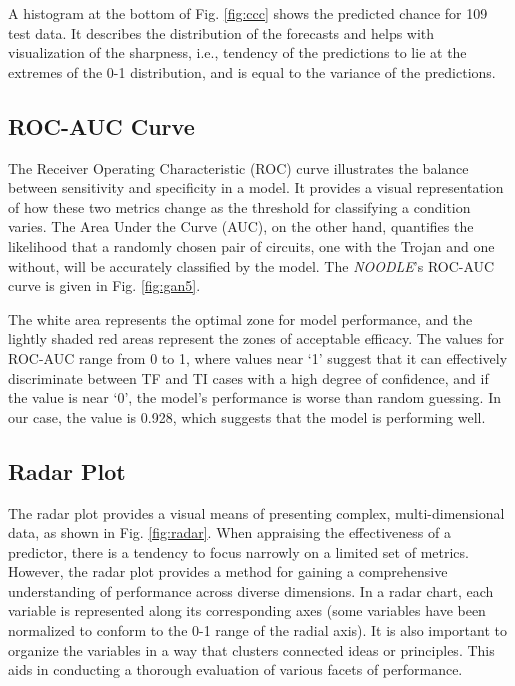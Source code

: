 A histogram at the bottom of Fig. \ref{fig:ccc} shows the predicted chance for 109 test data. It describes the distribution of the forecasts and helps with visualization of the sharpness, i.e., tendency of the predictions to lie at the extremes of the 0-1 distribution, and is equal to the variance of the predictions.


\subsection*{ROC-AUC Curve}
The Receiver Operating Characteristic (ROC) curve illustrates the balance between sensitivity and specificity in a model. It provides a visual representation of how these two metrics change as the threshold for classifying a condition varies. The Area Under the Curve (AUC), on the other hand, quantifies the likelihood that a randomly chosen pair of circuits, one with the Trojan and one without, will be accurately classified by the model. The \textit{NOODLE}'s ROC-AUC curve is given in Fig. \ref{fig:gan5}.

The white area represents the optimal zone for model performance, and the lightly shaded red areas represent the zones of acceptable efficacy. The values for ROC-AUC range from 0 to 1, where values near `1' suggest that it can effectively discriminate between TF and TI cases with a high degree of confidence, and if the value is near `0', the model's performance is worse than random guessing. In our case, the value is 0.928, which suggests that the model is performing well.

\subsection*{Radar Plot}
The radar plot provides a visual means of presenting complex, multi-dimensional data, as shown in Fig. \ref{fig:radar}. When appraising the effectiveness of a predictor, there is a tendency to focus narrowly on a limited set of metrics. However, the radar plot provides a method for gaining a comprehensive understanding of performance across diverse dimensions. In a radar chart, each variable is represented along its corresponding axes (some variables have been normalized to conform to the 0-1 range of the radial axis). It is also important to organize the variables in a way that clusters connected ideas or principles. This aids in conducting a thorough evaluation of various facets of performance.

